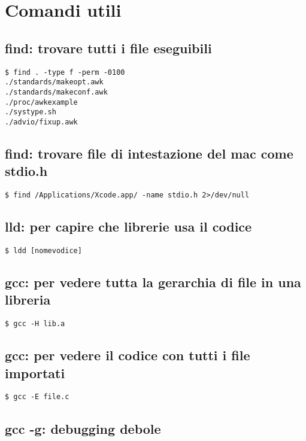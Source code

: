 \newpage
\section{Comandi utili}

\subsection{find: trovare tutti i file eseguibili}
	
\begin{lstlisting}
$ find . -type f -perm -0100
./standards/makeopt.awk
./standards/makeconf.awk
./proc/awkexample
./systype.sh
./advio/fixup.awk
\end{lstlisting}


\subsection{find: trovare file di intestazione del mac come stdio.h}

\begin{lstlisting}
$ find /Applications/Xcode.app/ -name stdio.h 2>/dev/null
\end{lstlisting}


\subsection{lld: per capire che librerie usa il codice}

\begin{lstlisting}
$ ldd [nomevodice]
\end{lstlisting}


\subsection{gcc: per vedere tutta la gerarchia di file in una libreria}

\begin{lstlisting}
$ gcc -H lib.a
\end{lstlisting}


\subsection{gcc: per vedere il codice con tutti i file importati}

\begin{lstlisting}
$ gcc -E file.c
\end{lstlisting}


\subsection{gcc -g: debugging debole}


